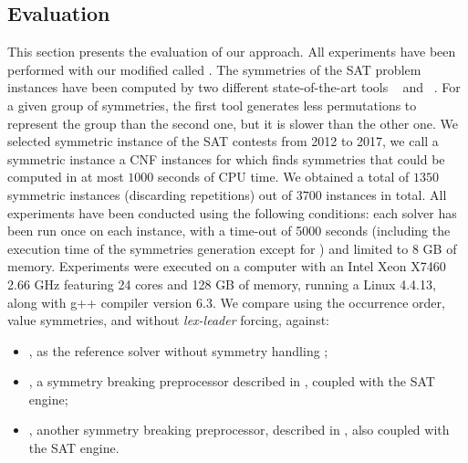 \subsection{Evaluation}
%
This section presents the evaluation of our approach. All experiments have been
performed with our modified \minisat{} called \cdclsym{}. The symmetries of the
SAT problem instances have been computed by two different state-of-the-art
tools \saucy{}~\cite{katebi2010symmetry} and
\bliss{}~\cite{JunttilaKaski:ALENEX2007}. For a given group of symmetries, the
first tool generates less permutations to represent the group than the second
one, but it is slower than the other one.
We selected symmetric instance  of the SAT contests\cite{jarvisalo2012international}
from 2012 to 2017, we call a symmetric instance a CNF instances for which \bliss{} finds
 symmetries that could be computed in at most $1000$ seconds of CPU time. We obtained a total of $1350$
symmetric instances (discarding repetitions) out of $3700$ instances in total.
All experiments have been conducted using the following conditions: each solver
has been run once on each instance, with a time-out of 5000 seconds (including
the execution time of the symmetries generation except for \minisat) and limited
to 8 GB of memory. Experiments were executed on a computer with an Intel Xeon
X7460 2.66 GHz featuring 24 cores and 128 GB of memory, running a Linux 4.4.13,
along with g++ compiler version 6.3.
We compare \cdclsym{} using the occurrence order, value symmetries, and without
\emph{lex-leader} forcing, against:
\begin{itemize}
 \item \minisat{}, as the reference solver without symmetry handling
 \cite{een2003extensible};
 
 \item \shatter{}, a symmetry breaking preprocessor described in \cite{aloul06},
 coupled with the \minisat{} SAT engine;
 
 \item \breakid{}, another symmetry breaking preprocessor, described in
 \cite{devriendt2016improved}, also coupled with the \minisat{} SAT engine.
\end{itemize}

